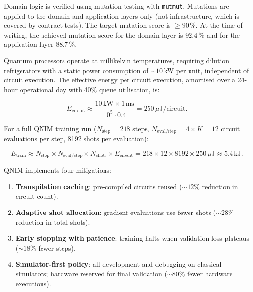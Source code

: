 \documentclass[11pt,a4paper, english]{book}
\theoremstyle{plain}
\theoremstyle{definition}
\numberwithin{equation}{chapter}
\numberwithin{figure}{chapter}
\numberwithin{table}{chapter}
\begin{document}
Domain logic is verified using mutation testing with \texttt{mutmut}.
Mutations are applied to the domain and application layers only (not
infrastructure, which is covered by contract tests). The target mutation
score is $\geq 90\,\%$. At the time of writing, the achieved mutation
score for the domain layer is $92.4\,\%$ and for the application layer
$88.7\,\%$.

Quantum processors operate at millikelvin temperatures, requiring dilution
refrigerators with a static power consumption of $\sim\!10$\,kW per unit,
independent of circuit execution. The effective energy per circuit execution,
amortised over a 24-hour operational day with 40\% queue utilisation, is:

\begin{equation}
  E_\mathrm{circuit} \approx \frac{10\,\mathrm{kW} \times 1\,\mathrm{ms}}
                               {10^5 \cdot 0.4} = 250\,\mu\mathrm{J/circuit}.
\end{equation}

For a full QNIM training run ($N_\mathrm{step}=218$ steps,
$N_\mathrm{eval/step}=4\times K=12$ circuit evaluations per step,
8192 shots per evaluation):

\begin{equation}
E_\mathrm{train} \approx N_\mathrm{step} \times N_\mathrm{eval/step} \times
  N_\mathrm{shots} \times E_\mathrm{circuit}
  = 218 \times 12 \times 8192 \times 250\,\mu\mathrm{J}
  \approx 5.4\,\mathrm{kJ}.
\end{equation}

QNIM implements four mitigations:

\begin{enumerate}
  \item \textbf{Transpilation caching}: pre-compiled circuits reused
        ($\sim\!12\%$ reduction in circuit count).

  \item \textbf{Adaptive shot allocation}: gradient evaluations use fewer
        shots ($\sim\!28\%$ reduction in total shots).

  \item \textbf{Early stopping with patience}: training halts when validation
        loss plateaus ($\sim\!18\%$ fewer steps).

  \item \textbf{Simulator-first policy}: all development and debugging on
        classical simulators; hardware reserved for final validation
        ($\sim\!80\%$ fewer hardware executions).
\end{enumerate}
\end{document}
